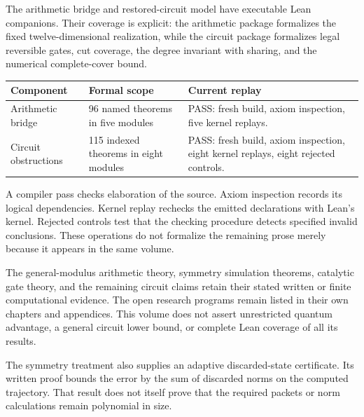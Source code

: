The arithmetic bridge and restored-circuit model have executable Lean companions. Their coverage is explicit: the arithmetic package formalizes the fixed twelve-dimensional realization, while the circuit package formalizes legal reversible gates, cut coverage, the degree invariant with sharing, and the numerical complete-cover bound.

\begin{longtable}{@{}p{.29\linewidth}p{.28\linewidth}p{.34\linewidth}@{}}\toprule
Component & Formal scope & Current replay\\\midrule\endhead
Arithmetic bridge & 96 named theorems in five modules & PASS: fresh build, axiom inspection, five kernel replays.\\
Circuit obstructions & 115 indexed theorems in eight modules & PASS: fresh build, axiom inspection, eight kernel replays, eight rejected controls.\\\bottomrule\end{longtable}

A compiler pass checks elaboration of the source. Axiom inspection records its logical dependencies. Kernel replay rechecks the emitted declarations with Lean's kernel. Rejected controls test that the checking procedure detects specified invalid conclusions. These operations do not formalize the remaining prose merely because it appears in the same volume.

The general-modulus arithmetic theory, symmetry simulation theorems, catalytic gate theory, and the remaining circuit claims retain their stated written or finite computational evidence. The open research programs remain listed in their own chapters and appendices. This volume does not assert unrestricted quantum advantage, a general circuit lower bound, or complete Lean coverage of all its results.

The symmetry treatment also supplies an adaptive discarded-state certificate. Its written proof bounds the error by the sum of discarded norms on the computed trajectory. That result does not itself prove that the required packets or norm calculations remain polynomial in size.
